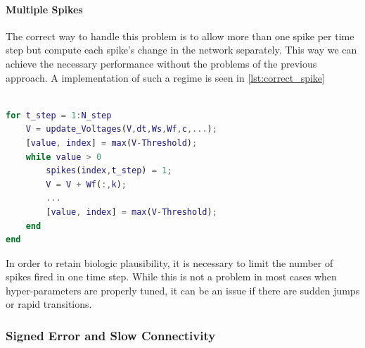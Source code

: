 \paragraph{Multiple Spikes}\label{p:multiple_spikes}
The correct way to handle this problem is to allow more than one spike per time step but compute each spike's change in the network separately. This way we can achieve the necessary performance without the problems of the previous approach. A implementation of such a regime is seen in \cref{lst:correct_spike}

\begin{lstlisting}[language=Matlab, caption=Letting each neurons spike as many times a necessary while computing each spike's influence sequentially.,label=lst:correct_spike]

for t_step = 1:N_step
	V = update_Voltages(V,dt,Ws,Wf,c,...);
	[value, index] = max(V-Threshold);
	while value > 0
		spikes(index,t_step) = 1;
		V = V + Wf(:,k);
		...
		[value, index] = max(V-Threshold);
	end
end
\end{lstlisting}
In order to retain biologic plausibility, it is necessary to limit the number of spikes fired in one time step. While this is not a problem in most cases when hyper-parameters are properly tuned, it can be an issue if there are sudden jumps or rapid transitions.\\

\subsubsection{Signed Error and Slow Connectivity}
